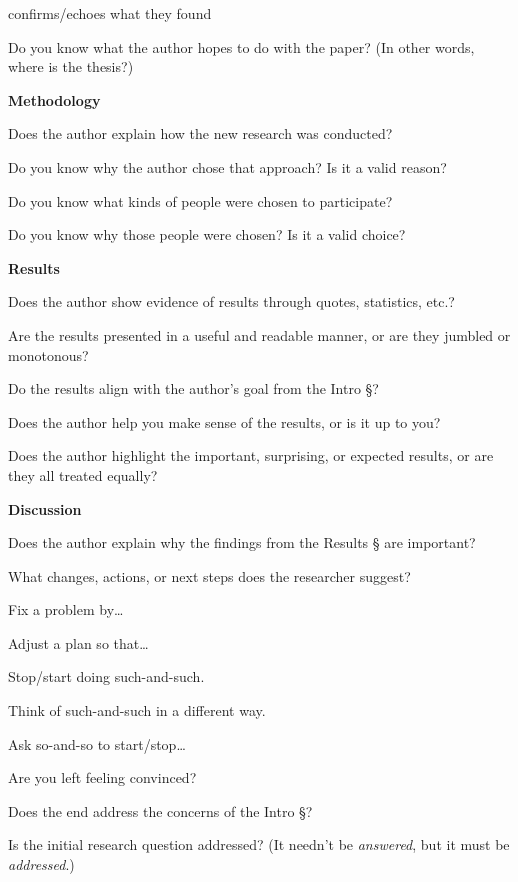 \documentclass[10pt,article,oneside]{memoir}
\begin{document}
\begin{multicols}{2}
\begin{compactitem}
\begin{compactitem}
\begin{compactitem}
			\item confirms/echoes what they found
		\end{compactitem}
		\item Do you know what the author hopes to do with the paper? (In other words, where is the thesis?)
	\end{compactitem}\columnbreak
	\item \textbf{Methodology}
	\begin{compactitem}
		\item Does the author explain how the new research was conducted?
		\item Do you know why the author chose that approach? Is it a valid reason?
		\item Do you know what kinds of people were chosen to participate?
		\item Do you know why those people were chosen? Is it a valid choice?
	\end{compactitem}
	\item \textbf{Results}
	\begin{compactitem}
		\item Does the author show evidence of results through quotes, statistics, etc.?
		\item Are the results presented in a useful and readable manner, or are they jumbled or monotonous?
		\item Do the results align with the author's goal from the Intro §?
		\item Does the author help you make sense of the results, or is it up to you?
		\item Does the author highlight the important, surprising, or expected results, or are they all treated equally?
	\end{compactitem}
	\item \textbf{Discussion}
	\begin{compactitem}
		\item Does the author explain why the findings from the Results § are important?
		\item What changes, actions, or next steps does the researcher suggest?
		\begin{compactitem}
			\item Fix a problem by…
			\item Adjust a plan so that…
			\item Stop/start doing such-and-such.
			\item Think of such-and-such in a different way.
			\item Ask so-and-so to start/stop…
		\end{compactitem}
		\item Are you left feeling convinced?
		\item Does the end address the concerns of the Intro §?
		\item Is the initial research question addressed? (It needn't be \emph{answered}, but it must be \emph{addressed}.)
	\end{compactitem}
\end{compactitem}
\end{multicols}
\end{document}
